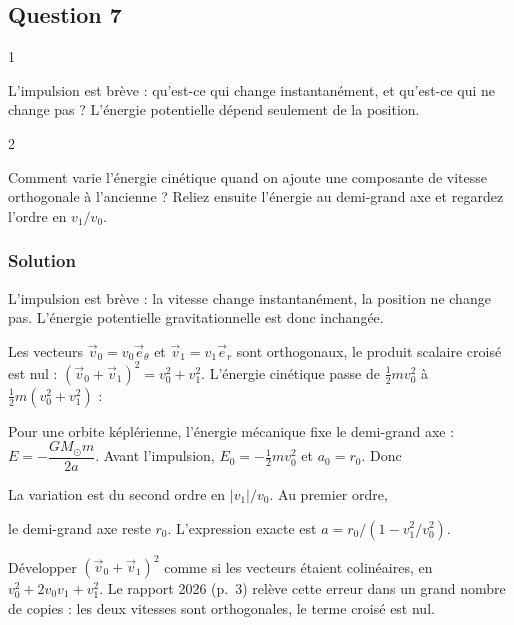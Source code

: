 \documentclass[11pt,a4paper]{article}
\newcommand{\equationajustee}[1]{%
  \sbox{\boiteequation}{$\displaystyle #1$}%
  \ifdim\wd\boiteequation>\linewidth
    \[\resizebox{\linewidth}{!}{\usebox{\boiteequation}}\]%
  \else
    \[#1\]%
  \fi}
\begin{document}
\hypertarget{question-7}{%
\subsection{Question 7}\label{question-7}}

\begin{indication}{1}

L'impulsion est brève : qu'est-ce qui change instantanément, et qu'est-ce qui ne change pas ? L'énergie potentielle dépend seulement de la position.

\end{indication}

\begin{indication}{2}

Comment varie l'énergie cinétique quand on ajoute une composante de vitesse orthogonale à l'ancienne ? Reliez ensuite l'énergie au demi-grand axe et regardez l'ordre en \(v_1/v_0\).

\end{indication}

\hypertarget{solution-6}{%
\subsubsection{Solution}\label{solution-6}}

L'impulsion est brève : la vitesse change instantanément, la position ne change pas. L'énergie potentielle gravitationnelle est donc inchangée.

Les vecteurs \(\vec v_0=v_0\vec e_\theta\) et \(\vec v_1=v_1\vec e_r\) sont orthogonaux, le produit scalaire croisé est nul : \((\vec v_0+\vec v_1)^2=v_0^2+v_1^2\). L'énergie cinétique passe de \(\frac12mv_0^2\) à \(\frac12m(v_0^2+v_1^2)\) :

\equationajustee{\boxed{\Delta E=\tfrac12mv_1^2>0}}

Pour une orbite képlérienne, l'énergie mécanique fixe le demi-grand axe : \(E=-\dfrac{GM_\odot m}{2a}\). Avant l'impulsion, \(E_0=-\frac12mv_0^2\) et \(a_0=r_0\). Donc

\equationajustee{\frac{\Delta a}{a}\simeq-\frac{\Delta E}{E_0}=\frac{v_1^2}{v_0^2} .}

La variation est du second ordre en \(|v_1|/v_0\). Au premier ordre,

\equationajustee{\boxed{\Delta a=0}}

le demi-grand axe reste \(r_0\). L'expression exacte est \(a=r_0/(1-v_1^2/v_0^2)\).

\begin{piege}

Développer \((\vec v_0+\vec v_1)^2\) comme si les vecteurs étaient colinéaires, en \(v_0^2+2v_0v_1+v_1^2\). Le rapport 2026 (p.~3) relève cette erreur dans un grand nombre de copies : les deux vitesses sont orthogonales, le terme croisé est nul.

\end{piege}
\end{document}
